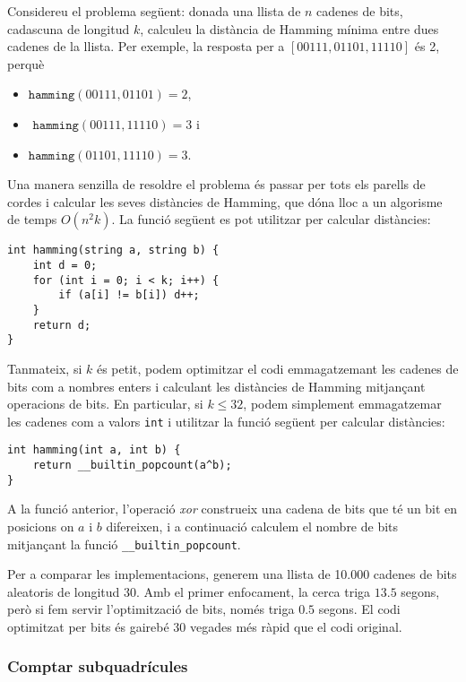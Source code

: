 Considereu el problema següent: donada una llista de $n$ cadenes de
bits, cadascuna de longitud $k$, calculeu la distància de Hamming
mínima entre dues cadenes de la llista. Per exemple, la resposta per a
$[00111,01101,11110]$ és 2, perquè
\begin{itemize}[noitemsep]
\item $\texttt{hamming}(00111,01101)=2$,
\item $\texttt{ hamming}(00111,11110)=3$ i
\item $\texttt{hamming}(01101,11110)=3$.
\end{itemize}

Una manera senzilla de resoldre el problema és passar per tots els
parells de cordes i calcular les seves distàncies de Hamming, que dóna
lloc a un algorisme de temps $O(n^2 k)$. La funció següent es pot
utilitzar per calcular distàncies:
\begin{lstlisting}
int hamming(string a, string b) {
    int d = 0;
    for (int i = 0; i < k; i++) {
        if (a[i] != b[i]) d++;
    }
    return d;
}
\end{lstlisting}


Tanmateix, si $k$ és petit, podem optimitzar el codi emmagatzemant les
cadenes de bits com a nombres enters i calculant les distàncies de
Hamming mitjançant operacions de bits. En particular, si $k \le 32$,
podem simplement emmagatzemar les cadenes com a valors \texttt{int} i
utilitzar la funció següent per calcular distàncies:
\begin{lstlisting}
int hamming(int a, int b) {
    return __builtin_popcount(a^b);
}
\end{lstlisting}
A la funció anterior, l'operació \emph{xor} construeix una cadena de bits que
té un bit en posicions on $a$ i $b$ difereixen, i a continuació calculem
el nombre de bits mitjançant la funció \texttt{\_\_builtin\_popcount}.

Per a comparar les implementacions, generem una llista de 10.000
cadenes de bits aleatoris de longitud 30. Amb el primer enfocament, la
cerca triga $13.5$ segons, però si fem servir l'optimització de bits,
només triga $0.5$ segons. El codi optimitzat per bits és gairebé 30
vegades més ràpid que el codi original.

\subsubsection{Comptar subquadrícules}

